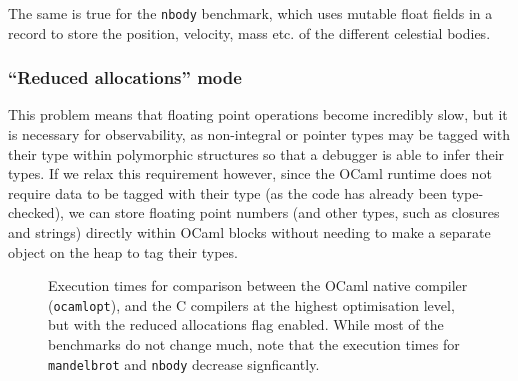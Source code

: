 \documentclass[12pt,a4paper,twoside,openright]{report}
\begin{document}
The same is true for the \texttt{nbody} benchmark, which uses mutable float 
fields in a record to store the position, velocity, mass etc. of the different 
celestial bodies.

\subsubsection{``Reduced allocations'' mode}

This problem means that floating point operations become incredibly slow, but 
it is necessary for observability, as non-integral or pointer types may be 
tagged with their type within polymorphic structures so that a debugger is able 
to infer their types. If we relax this requirement however, since the OCaml 
runtime does not require data to be tagged with their type (as the code has 
already been type-checked), we can store floating point numbers (and other 
types, such as closures and strings) directly within OCaml blocks without 
needing to make a separate object on the heap to tag their types.

\begin{figure}
    \centering
    \caption{Execution times for comparison between the OCaml native compiler 
    (\texttt{ocamlopt}), and the C compilers at the highest optimisation level, 
    but with the reduced allocations flag enabled. While most of the benchmarks 
    do not change much, note that the execution times for \texttt{mandelbrot} 
    and \texttt{nbody} decrease signficantly.}
    \label{fig:benchmarks-no-alloc}
\end{figure}
\end{document}
